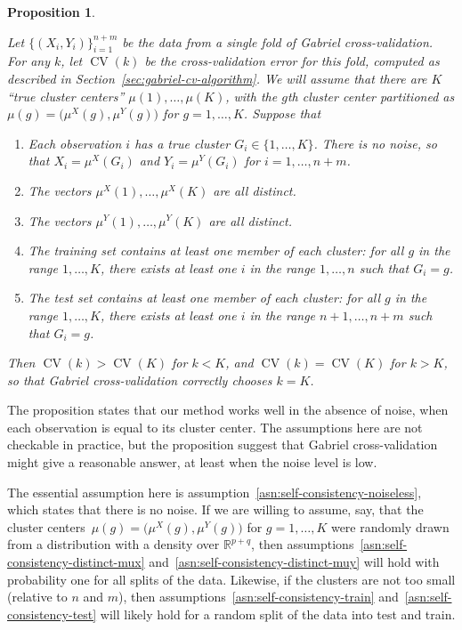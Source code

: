 \documentclass[12pt]{article}
\newtheorem{proposition}{Proposition}
\newcommand{\CV}{\operatorname{CV}}
\newcommand{\R}{\mathbb{R}}
\newcommand{\muX}{\mu^{X}}
\newcommand{\muY}{\mu^{Y}}
\begin{document}
\begin{proposition}\label{prop:self-consistency}

Let $\{ (X_i, Y_i) \}_{i=1}^{n+m}$ be the data from a single fold of Gabriel
cross-validation.  For any $k$, let $\CV(k)$ be the cross-validation error for
this fold, computed as described in Section~\ref{sec:gabriel-cv-algorithm}.
We will assume that there are $K$ ``true cluster centers''
$\mu(1), \dotsc,\mu(K)$, with
the $g$th cluster center partitioned as $\mu(g) = \bigl(\muX(g),
\muY(g)\bigr)$ for $g = 1, \dotsc, K$.  Suppose that
\begin{enumerate}[label=(\roman*)]
  \item \label{asn:self-consistency-noiseless}
    Each observation $i$ has a true cluster $G_i \in \{ 1, \dotsc, K \}$.
    There is no noise, so that $X_i = \muX({G_i})$ and $Y_i = \muY(G_i)$ for
    $i = 1, \dotsc, n+m$.
  \item \label{asn:self-consistency-distinct-mux}
    The vectors $\muX(1), \dotsc,\muX(K)$ are all distinct.
  \item \label{asn:self-consistency-distinct-muy}
    The vectors $\muY(1), \dotsc,\muY(K)$ are all distinct.
  \item \label{asn:self-consistency-train}
    The training set contains at least one member of each cluster: for all $g$
    in the range $1, \dotsc, K$, there exists at least one $i$ in the range
    $1, \dotsc, n$ such that $G_i = g$.
  \item \label{asn:self-consistency-test}
    The test set contains at least one member of each cluster: for all $g$ in
    the range $1, \dotsc, K$, there exists at least one $i$ in the range $n+1,
    \dotsc, n+m$ such that $G_i = g$.
\end{enumerate}
Then $\CV(k) > \CV(K)$ for $k < K$, and $\CV(k) = \CV(K)$ for $k > K$, so that
Gabriel cross-validation correctly chooses $k = K$.
\end{proposition}

The proposition states that our method works well in the absence of noise,
when each observation is equal to its cluster center.  The assumptions here
are not checkable in practice, but the proposition suggest that Gabriel
cross-validation might give a reasonable answer, at least when the noise level
is low.

The essential
assumption here is assumption~\ref{asn:self-consistency-noiseless}, which states
that there is no noise.  If we are willing to assume, say, that the cluster
centers~$\mu(g) = \bigl(\muX(g),\muY(g)\bigr)$ for $g = 1, \dotsc, K$ were
randomly drawn from a distribution with a density over $\R^{p+q}$, then
assumptions~\ref{asn:self-consistency-distinct-mux}
and~\ref{asn:self-consistency-distinct-muy} will hold with probability one for
all splits of the data. Likewise, if the clusters are not too small (relative
to $n$ and $m$), then assumptions~\ref{asn:self-consistency-train}
and~\ref{asn:self-consistency-test} will likely hold for a random split of the
data into test and train.
\end{document}
